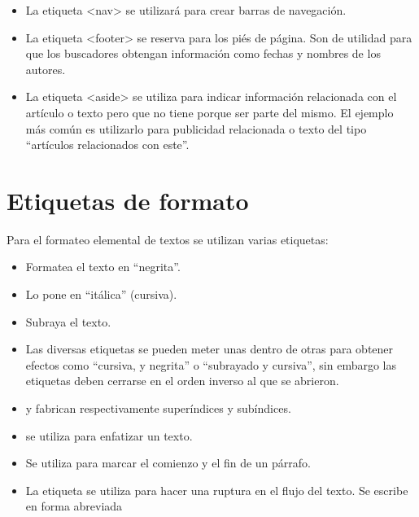 \documentclass[letterpaper,10pt,spanish]{sphinxmanual}
\begin{document}
\begin{itemize}
\item {} 
La etiqueta \textless{}nav\textgreater{} se utilizará para crear barras de navegación.

\item {} 
La etiqueta \textless{}footer\textgreater{} se reserva para los piés de página. Son de utilidad para que los buscadores obtengan información como fechas y nombres de los autores.

\item {} 
La etiqueta \textless{}aside\textgreater{} se utiliza para indicar información relacionada con el artículo o texto pero que no tiene porque ser parte del mismo. El ejemplo más común es utilizarlo para publicidad relacionada o texto del tipo ``artículos relacionados con este''.

\end{itemize}


\section{Etiquetas de formato}
\label{tema2:etiquetas-de-formato}
Para el formateo elemental de textos se utilizan varias etiquetas:
\begin{itemize}
\item {} 
 Formatea el texto en “negrita”.

\item {} 
 Lo pone en “itálica” (cursiva).

\item {} 
 Subraya el texto.

\item {} 
Las diversas etiquetas se pueden meter unas dentro de otras para obtener efectos como “cursiva, y negrita” o “subrayado y cursiva”, sin embargo las etiquetas deben cerrarse en el orden inverso al que se abrieron.

\item {} 
 y  fabrican respectivamente superíndices y subíndices.

\item {} 
 se utiliza para enfatizar un texto.

\item {} 
 Se utiliza para marcar el comienzo y el fin de un párrafo.

\item {} 
La etiqueta  se utiliza para hacer una ruptura en el flujo del texto. Se escribe en forma abreviada 

\end{itemize}
\end{document}
